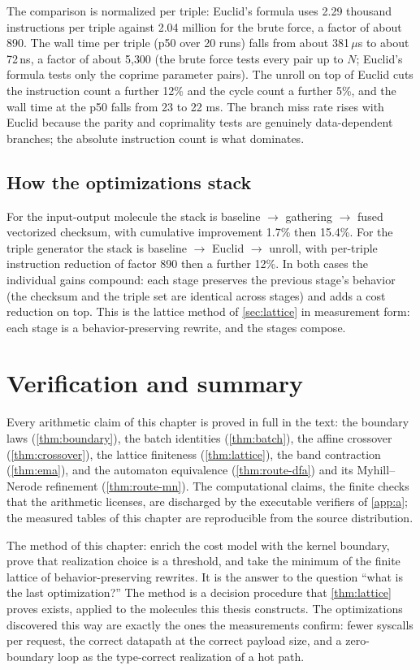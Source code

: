 The comparison is normalized per triple: Euclid's formula uses 2.29
thousand instructions per triple against 2.04 million for the brute
force, a factor of about 890. The wall time per triple (p50 over 20
runs) falls from about 381\,$\mu$s to about 72\,ns, a factor of about
5{,}300 (the brute force tests every pair up to $N$; Euclid's formula
tests only the coprime parameter pairs). The unroll on top of Euclid
cuts the instruction count a further 12\% and the cycle count a
further 5\%, and the wall time at the p50 falls from 23 to 22 ms. The
branch miss rate rises with Euclid because the parity and coprimality
tests are genuinely data-dependent branches; the absolute instruction
count is what dominates.

\subsection{How the optimizations stack}

For the input-output molecule the stack is
baseline $\to$ gathering $\to$ fused vectorized checksum, with
cumulative improvement 1.7\% then 15.4\%. For the triple generator the
stack is baseline $\to$ Euclid $\to$ unroll, with per-triple
instruction reduction of factor 890 then a further 12\%. In both cases
the individual gains compound: each stage preserves the previous
stage's behavior (the checksum and the triple set are identical across
stages) and adds a cost reduction on top. This is the lattice method
of \autoref{sec:lattice} in measurement form: each stage is a
behavior-preserving rewrite, and the stages compose.

\section{Verification and summary}\label{sec:breakthrough-verify}

Every arithmetic claim of this chapter is proved in full in the text:
the boundary laws (\autoref{thm:boundary}), the batch identities
(\autoref{thm:batch}), the affine crossover (\autoref{thm:crossover}),
the lattice finiteness (\autoref{thm:lattice}), the band contraction
(\autoref{thm:ema}), and the automaton equivalence
(\autoref{thm:route-dfa}) and its Myhill--Nerode refinement
(\autoref{thm:route-mn}). The computational claims, the finite
checks that the arithmetic licenses, are discharged by the executable
verifiers of \autoref{app:a}; the measured tables of this chapter are
reproducible from the source distribution.

The method of this chapter: enrich the cost model with the kernel
boundary, prove that realization choice is a threshold, and take the
minimum of the finite lattice of behavior-preserving rewrites. It is
the answer to the question ``what is the last optimization?'' The
method is a decision procedure that
\autoref{thm:lattice} proves exists, applied to the molecules this
thesis constructs. The optimizations discovered this way are exactly
the ones the measurements confirm: fewer syscalls per request, the
correct datapath at the correct payload size, and a zero-boundary loop
as the type-correct realization of a hot path.
